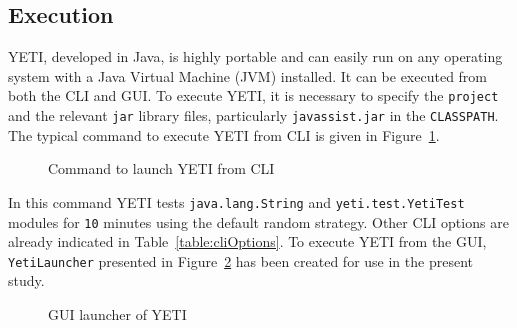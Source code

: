 \subsection{Execution}
YETI, developed in Java, is highly portable and can easily run on any operating system with a Java Virtual Machine (JVM) installed. It can be executed from both the CLI and GUI. To execute YETI, it is necessary to specify the \verb+project+ and the relevant \verb+jar+ library files, particularly \verb+javassist.jar+ in the \verb+CLASSPATH+. The typical command to execute YETI from CLI is given in Figure~\ref{fig:yeticommand}.
\smallskip
\begin{figure}[H]
	\centering
	\smallskip
	\caption{Command to launch YETI from CLI}
	\label{fig:yeticommand}
\end{figure}
\smallskip
In this command YETI tests \verb+java.lang.String+ and \verb+yeti.test.YetiTest+ modules for \verb+10+ minutes using the default random strategy. Other CLI options are already indicated in Table~\ref{table:cliOptions}. To execute YETI from the GUI, \verb+YetiLauncher+ presented in Figure~\ref{fig:yetiLauncher} has been created for use in the present study.
\bigskip
\begin{figure}[H]
	\centering
	\smallskip
	\caption{GUI launcher of YETI}
	\label{fig:yetiLauncher}
\end{figure}


